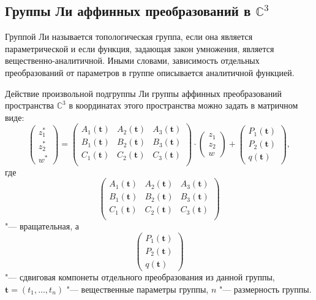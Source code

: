 \documentclass[../main.tex]{subfiles}
\begin{document}
\subsection{Группы Ли аффинных преобразований в $\mathbb{C}^3$}
Группой Ли называется топологическая группа, если она является параметрической и если функция, задающая закон умножения, является вещественно-аналитичной. Иными словами, зависимость отдельных преобразований от параметров в группе описывается аналитичной функцией.

Действие произвольной подгруппы Ли группы аффинных преобразований пространства $\mathbb{C}^3$ в координатах этого пространства можно задать в матричном виде:
\begin{equation}\label{eq:affine_transform}
\begin{pmatrix}
z_1^* \\
z_2^* \\
w^*
\end{pmatrix} = 
\begin{pmatrix}
A_1(\mathbf t) & A_2(\mathbf t) & A_3(\mathbf t) \\
B_1(\mathbf t) & B_2(\mathbf t) & B_3(\mathbf t) \\
C_1(\mathbf t) & C_2(\mathbf t) & C_3(\mathbf t) \\
\end{pmatrix}
\cdot
\begin{pmatrix}
z_1 \\
z_2 \\
w
\end{pmatrix}
+
\begin{pmatrix}
P_1(\mathbf t) \\
P_2(\mathbf t) \\
q(\mathbf t)
\end{pmatrix},
\end{equation}
где
\begin{equation*}
\begin{pmatrix}
A_1(\mathbf t) & A_2(\mathbf t) & A_3(\mathbf t) \\
B_1(\mathbf t) & B_2(\mathbf t) & B_3(\mathbf t) \\
C_1(\mathbf t) & C_2(\mathbf t) & C_3(\mathbf t) \\
\end{pmatrix}
\end{equation*}
"--- вращательная, а
\begin{equation*}
\begin{pmatrix}
P_1(\mathbf t) \\
P_2(\mathbf t) \\
q(\mathbf t)
\end{pmatrix}
\end{equation*}
"--- сдвиговая компонеты отдельного преобразования из данной группы, $\mathbf t = (t_1, \hdots, t_n)$ "--- вещественные параметры группы, $n$ "--- размерность группы.
\end{document}
